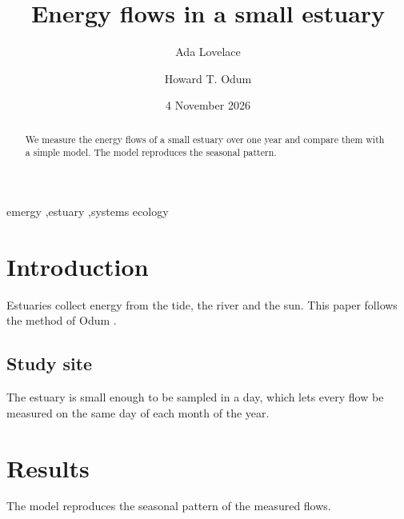 \documentclass[preprint,12pt]{elsarticle}
\date{4 November 2026}
\begin{document}
\begin{frontmatter}
\title{Energy flows in a small estuary}
\author[a]{Ada Lovelace}
\author[a,b]{Howard T. Odum}
\address[a]{Department of Systems Ecology, University of Florida, Gainesville, USA}
\address[b]{Marine Science Institute, Port Aransas, USA}
\begin{abstract}
We measure the energy flows of a small estuary over one year and compare
them with a simple model. The model reproduces the seasonal pattern.
\end{abstract}
\begin{keyword}
emergy \sep estuary \sep systems ecology
\end{keyword}
\end{frontmatter}

\section{Introduction}
Estuaries collect energy from the tide, the river and the sun. This paper
follows the method of Odum \cite{odum_systems_1983}.

\subsection{Study site}
The estuary is small enough to be sampled in a day, which lets every flow
be measured on the same day of each month of the year.

\section{Results}
The model reproduces the seasonal pattern of the measured flows.



\end{document}
